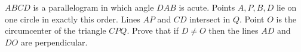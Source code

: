 $ABCD$ is a parallelogram in which angle $DAB$ is acute. Points $A, P, B, D$ lie on one circle in exactly this order. Lines $AP$ and $CD$ intersect in $Q$. Point $O$ is the circumcenter of the triangle $CPQ$. Prove that if $D \neq O$ then the lines $AD$ and $DO$ are perpendicular.